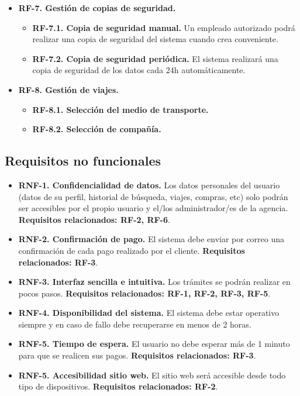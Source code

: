 \documentclass{article}
\begin{document}
\begin{itemize}
		\item {\bf RF-7. Gestión de copias de seguridad.}
		\begin{itemize}
			\item \textbf{RF-7.1. Copia de seguridad manual.} Un empleado autorizado podrá realizar una copia de seguridad del sistema cuando crea conveniente.
			\item \textbf{RF-7.2. Copia de seguridad periódica.} El sistema realizará una copia de seguridad de los datos cada 24h automáticamente.
		\end{itemize}
	
		\item \textbf{RF-8. Gestión de viajes.}
		\begin{itemize}
			\item \textbf{RF-8.1. Selección del medio de transporte.}
			\item \textbf{RF-8.2. Selección de compañía.}
		\end{itemize}
	\end{itemize}
	\subsection{Requisitos no funcionales}
	\begin{itemize}
		\item {\bf RNF-1. Confidencialidad de datos.} Los datos personales del usuario (datos de su perfil, historial de búsqueda, viajes, compras, etc) solo podrán ser accesibles por el propio usuario y el/los administrador/es de la agencia. \textbf{Requisitos relacionados: RF-2, RF-6}.
		\item {\bf RNF-2. Confirmación de pago.} El sistema debe enviar por correo una confirmación de cada pago realizado por el cliente. \textbf{Requisitos relacionados: RF-3}.
		\item \textbf{RNF-3. Interfaz sencilla e intuitiva.} Los trámites se podrán realizar en pocos pasos. \textbf{Requisitos relacionados: RF-1, RF-2, RF-3, RF-5}.
		\item \textbf{RNF-4. Disponibilidad del sistema.} El sistema debe estar operativo siempre y en caso de fallo debe recuperarse en menos de 2 horas.
		\item \textbf{RNF-5. Tiempo de espera.} El usuario no debe esperar más de 1 minuto para que se realicen sus pagos. \textbf{Requisitos relacionados: RF-3}.
		\item \textbf{RNF-5. Accesibilidad sitio web.} El sitio web será accesible desde todo tipo de dispositivos. \textbf{Requisitos relacionados: RF-2}.
		
	\end{itemize}
\end{document}
